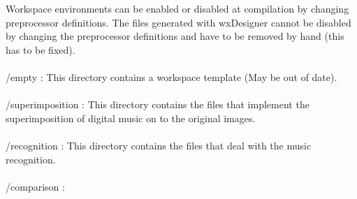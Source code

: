 \documentclass[]{article}
\begin{document}
Workspace environments can be enabled or disabled at compilation by changing
preprocessor definitions. The files generated with wxDesigner cannot be disabled
by changing the preprocessor definitions and have to be removed by hand (this
has to be fixed).\\\\
/empty : This directory contains a workspace template (May be out of date).\\\\ 
/superimposition : This directory contains the files that implement the superimposition
of digital music on to the original images.\\\\
/recognition : This directory contains the files that deal with the music recognition.\\\\
/comparison :
\end{document}
